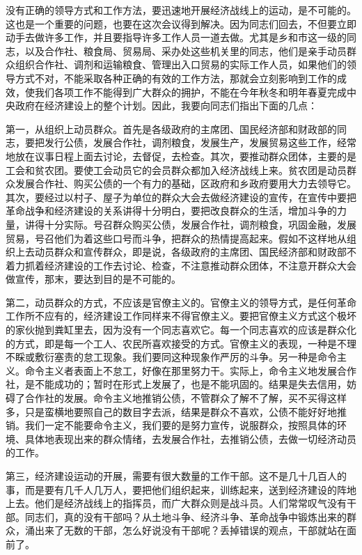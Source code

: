 没有正确的领导方式和工作方法，要迅速地开展经济战线上的运动，是不可能的。这也是一个重要的问题，也要在这次会议得到解决。因为同志们回去，不但要立即动手去做许多工作，并且要指导许多工作人员一道去做。尤其是乡和市这一级的同志，以及合作社、粮食局、贸易局、采办处这些机关里的同志，他们是亲手动员群众组织合作社、调剂和运输粮食、管理出入口贸易的实际工作人员，如果他们的领导方式不对，不能采取各种正确的有效的工作方法，那就会立刻影响到工作的成效，使我们各项工作不能得到广大群众的拥护，不能在今年秋冬和明年春夏完成中央政府在经济建设上的整个计划。因此，我要向同志们指出下面的几点：

第一，从组织上动员群众。首先是各级政府的主席团、国民经济部和财政部的同志，要把发行公债，发展合作社，调剂粮食，发展生产，发展贸易这些工作，经常地放在议事日程上面去讨论，去督促，去检查。其次，要推动群众团体，主要的是工会和贫农团。要使工会动员它的会员群众都加入经济战线上来。贫农团是动员群众发展合作社、购买公债的一个有力的基础，区政府和乡政府要用大力去领导它。其次，要经过以村子、屋子为单位的群众大会去做经济建设的宣传，在宣传中要把革命战争和经济建设的关系讲得十分明白，要把改良群众的生活，增加斗争的力量，讲得十分实际。号召群众购买公债，发展合作社，调剂粮食，巩固金融，发展贸易，号召他们为着这些口号而斗争，把群众的热情提高起来。假如不这样地从组织上去动员群众和宣传群众，即是说，各级政府的主席团、国民经济部和财政部不着力抓着经济建设的工作去讨论、检查，不注意推动群众团体，不注意开群众大会做宣传，那末，要达到目的是不可能的。

第二，动员群众的方式，不应该是官僚主义的。官僚主义的领导方式，是任何革命工作所不应有的，经济建设工作同样来不得官僚主义。要把官僚主义方式这个极坏的家伙抛到粪缸里去，因为没有一个同志喜欢它。每一个同志喜欢的应该是群众化的方式，即是每一个工人、农民所喜欢接受的方式。官僚主义的表现，一种是不理不睬或敷衍塞责的怠工现象。我们要同这种现象作严厉的斗争。另一种是命令主义。命令主义者表面上不怠工，好像在那里努力干。实际上，命令主义地发展合作社，是不能成功的；暂时在形式上发展了，也是不能巩固的。结果是失去信用，妨碍了合作社的发展。命令主义地推销公债，不管群众了解不了解，买不买得这样多，只是蛮横地要照自己的数目字去派，结果是群众不喜欢，公债不能好好地推销。我们一定不能要命令主义，我们要的是努力宣传，说服群众，按照具体的环境、具体地表现出来的群众情绪，去发展合作社，去推销公债，去做一切经济动员的工作。

第三，经济建设运动的开展，需要有很大数量的工作干部。这不是几十几百人的事，而是要有几千人几万人，要把他们组织起来，训练起来，送到经济建设的阵地上去。他们是经济战线上的指挥员，而广大群众则是战斗员。人们常常叹气没有干部。同志们，真的没有干部吗？从土地斗争、经济斗争、革命战争中锻炼出来的群众，涌出来了无数的干部，怎么好说没有干部呢？丢掉错误的观点，干部就站在面前了。

